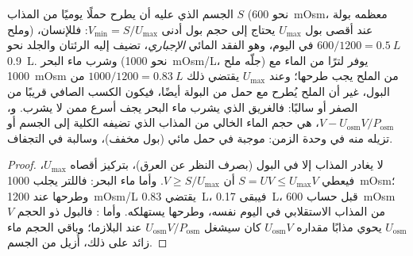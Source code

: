 \begin{proposition}\label{prop:b3:renal-osmoregulation:water}
الجسم الذي عليه أن يطرح حملًا يوميًا من المذاب $S$ (نحو
\qty{600}{mOsm}، معظمه بولة وملح) عند أقصى  بول
$U_{\max}$ يحتاج إلى حجم بول أدنى $V_{\min} = S/U_{\max}$:
فللإنسان، $600/1200 = \qty{0.5}{L}$ في اليوم، وهو الفقد المائي
\emph{الإجباري}، تضيف إليه الرئتان والجلد نحو \qty{0.9}{L}.
وشرب ماء البحر (نحو \qty{1000}{mOsm/L}، جلّه ملح) يوفر لترًا
من الماء مع \qty{1000}{mOsm} من الملح يجب طرحها؛ وعند
$U_{\max}$ يقتضي ذلك $1000/1200 = \qty{0.83}{L}$ من البول، غير
أن الملح يُطرح مع حمل من البولة أيضًا، فيكون الكسب الصافي
قريبًا من الصفر أو سالبًا: فالغريق الذي يشرب ماء البحر يجف
أسرع ممن لا يشرب. و\emph{}،
$V - U_{\text{osm}}V/P_{\text{osm}}$، هي حجم الماء الخالي من
المذاب الذي تضيفه الكلية إلى الجسم أو تزيله منه في وحدة
الزمن: موجبة في حمل مائي (بول مخفف)، وسالبة في التجفاف.
\end{proposition}
\begin{proof}
لا يغادر المذاب إلا في البول (بصرف النظر عن العرق)، بتركيز
أقصاه $U_{\max}$، فيعطي $S = U V \le U_{\max}V$ أن
$V \ge S/U_{\max}$. وأما ماء البحر: فاللتر يجلب
\qty{1000}{mOsm}؛ وطرحها عند \qty{1200}{mOsm/L} يقتضي
\qty{0.83}{L}، فيبقى \qty{0.17}{L}، قبل حساب \qty{600}{mOsm}
من المذاب الاستقلابي في اليوم نفسه، وطرحها يستهلكه. وأما
: فالبول ذو الحجم $V$ 
$U_{\text{osm}}$ يحوي مذابًا مقداره $U_{\text{osm}}V$ كان
سيشغل $U_{\text{osm}}V/P_{\text{osm}}$ عند  البلازما؛
وباقي الحجم ماء زائد على ذلك، أُزيل من الجسم.
\end{proof}

